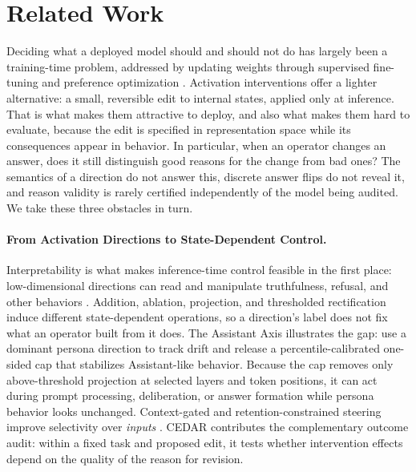 \documentclass[letterpaper]{article} %
\begin{document}
\section{Related Work}
\label{sec:background}

Deciding what a deployed model should and should not do has largely been a training-time problem, addressed by updating weights through supervised fine-tuning and preference optimization \citep{ouyang2022training,rafailov2023direct}. Activation interventions offer a lighter alternative: a small, reversible edit to internal states, applied only at inference. That is what makes them attractive to deploy, and also what makes them hard to evaluate, because the edit is specified in representation space while its consequences appear in behavior. In particular, when an operator changes an answer, does it still distinguish good reasons for the change from bad ones? The semantics of a direction do not answer this, discrete answer flips do not reveal it, and reason validity is rarely certified independently of the model being audited. We take these three obstacles in turn.

\paragraph{From Activation Directions to State-Dependent Control.}

Interpretability is what makes inference-time control feasible in the first place: low-dimensional directions can read and manipulate truthfulness, refusal, and other behaviors \citep{zou2023representation,turner2023steering,li2023inference,rimsky2024steering,arditi2024refusal}. Addition, ablation, projection, and thresholded rectification induce different state-dependent operations, so a direction's label does not fix what an operator built from it does. The Assistant Axis illustrates the gap: \citet{lu2026assistant} use a dominant persona direction to track drift and release a percentile-calibrated one-sided cap that stabilizes Assistant-like behavior. Because the cap removes only above-threshold projection at selected layers and token positions, it can act during prompt processing, deliberation, or answer formation while persona behavior looks unchanged. Context-gated and retention-constrained steering improve selectivity over \emph{inputs} \citep{lee2025programming,stickland2024steering}. CEDAR contributes the complementary outcome audit: within a fixed task and proposed edit, it tests whether intervention effects depend on the quality of the reason for revision.
\end{document}
